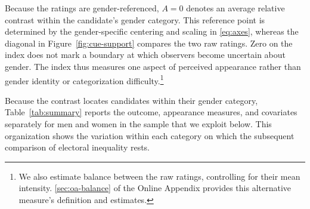 \documentclass[11pt,a4paper]{article}\usepackage[]{graphicx}\usepackage[]{xcolor}
\begin{document}
Because the ratings are gender-referenced, $A=0$ denotes an average relative contrast within the candidate's gender category. This reference point is determined by the gender-specific centering and scaling in \autoref{eq:axes}, whereas the diagonal in Figure~\ref{fig:cue-support} compares the two raw ratings. Zero on the index does not mark a boundary at which observers become uncertain about gender. The index thus measures one aspect of perceived appearance rather than gender identity or categorization difficulty.\footnote{We also estimate balance between the raw ratings, controlling for their mean intensity. \autoref{sec:oa-balance} of the Online Appendix provides this alternative measure's definition and estimates.}

Because the contrast locates candidates within their gender category, Table~\ref{tab:summary} reports the outcome, appearance measures, and covariates separately for men and women in the sample that we exploit below. This organization shows the variation within each category on which the subsequent comparison of electoral inequality rests.
\end{document}
